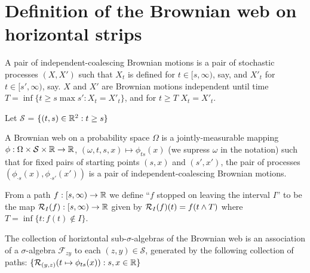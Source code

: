 {
\newcommand{\factor}[2]{\mathcal{F}_{#1 #2}}
\newcommand{\commafactor}[2]{\mathcal{F}_{#1,#2}}
\newcommand{\simplex}{\mathcal{S}}

\section{Definition of the Brownian web on horizontal strips}

\begin{definition}
  A pair of independent-coalescing Brownian motions is a pair of
  stochastic processes $(X, X')$ such that $X_t$ is defined for $t \in
  [s, \infty)$, say, and $X'_t$ for $t \in [s', \infty)$, say.  $X$
      and $X'$ are Brownian motions independent until time $T = \inf
      \{ t \ge s \max s' : X_t = X'_t\}$, and for $t \ge T$ $X_t =
      X'_t$.
\end{definition}

\begin{definition}
  Let $\simplex$ = $\{(t, s) \in \mathbb{R}^2 : t \ge s\}$
\end{definition}

\newcommand{\webnoargs}{\phi}
\newcommand{\web}[2]{\webnoargs_{#1}(#2)}

\begin{definition}
  A Brownian web on a probability space $\Omega$ is a
  jointly-measurable mapping $\webnoargs : \Omega \cross \simplex \cross
  \R \to \R$, $(\omega, t, s, x) \mapsto \web{ts}{x}$ (we supress
  $\omega$ in the notation) such that for fixed pairs of starting
  points $(s, x)$ and $(s', x')$, the pair of processes $(\web{\cdot
    s}{x}, \web{\cdot s'}{x'})$ is a pair of independent-coalescing
  Brownian motions.
\end{definition}

\begin{definition}
  \label{def:restrict}
  From a path $f : [s, \infty) \to \mathbb{R}$ we define ``$f$ stopped on
    leaving the interval $I$'' to be the map $\mathcal{R}_{I}(f) : [s,
      \infty) \to \mathbb{R}$ given by $\mathcal{R}_{I}(f)(t) = f(t \wedge T)$
      where $T = \inf\{ t : f(t) \not\in I \}$.
\end{definition}

\newcommand{\brownianwebnoise}{collection of horiztontal
  sub-$\sigma$-algebras of the Brownian web}

\begin{definition}
  The \brownianwebnoise{} is an
  association of a $\sigma$-algebra $\factor{z}{y}$ to each $(z, y)
  \in \simplex$, generated by the following collection of paths:
  $\{ \restrict{(y,z)}{t \mapsto \web{ts}{x}} : s, x \in \R \}$
\end{definition}

}
